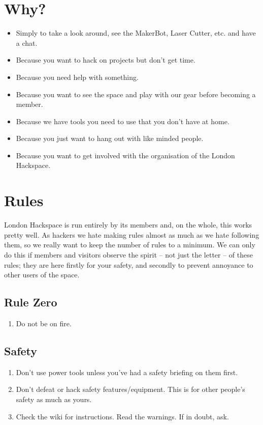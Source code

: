 \documentclass[11pt,a5paper,twoside]{memoir}
\begin{document}
\section{Why?}

\begin{itemize}
	\item Simply to take a look around, see the MakerBot, Laser Cutter, etc. and have a chat.
	\item Because you want to hack on projects but don't get time.
	\item Because you need help with something.
	\item Because you want to see the space and play with our gear before becoming a member.
	\item Because we have tools you need to use that you don't have at home.
	\item Because you just want to hang out with like minded people.
	\item Because you want to get involved with the organisation of the London Hackspace.
\end{itemize}

\section{Rules}

London Hackspace is run entirely by its members and, on the whole, this works pretty well. As hackers we hate making rules almost as much as we hate following them, so we really want to keep the number of rules to a minimum. We can only do this if members and visitors observe the spirit -- not just the letter -- of these rules; they are here firstly for your safety, and secondly to prevent annoyance to other users of the space.

\subsection{Rule Zero}

\begin{enumerate}[start=0]
	\item Do not be on fire.
\end{enumerate}

\subsection{Safety}

\begin{enumerate}[resume]
	\item Don't use power tools unless you've had a safety briefing on them first.
	\item Don't defeat or hack safety features/equipment. This is for other people's safety as much as yours.
	\item Check the wiki for instructions. Read the warnings. If in doubt, ask.
\end{enumerate}
\end{document}
